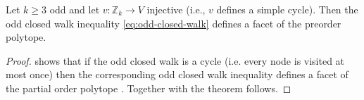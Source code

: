 \begin{theorem}
    Let $k \geq 3$ odd and let $v: \mathbb{Z}_k \to V$ injective (i.e., $v$ defines a simple cycle).
    Then the odd closed walk inequality \eqref{eq:odd-closed-walk} defines a facet of the preorder polytope.
\end{theorem}

\begin{proof}
    \citet{muller1996partial} shows that if the odd closed walk is a cycle (i.e. every node is visited at most once) then the corresponding odd closed walk inequality defines a facet of the partial order polytope \citep[Theorem 4.2]{muller1996partial}.
    Together with  the theorem follows.
\end{proof}
